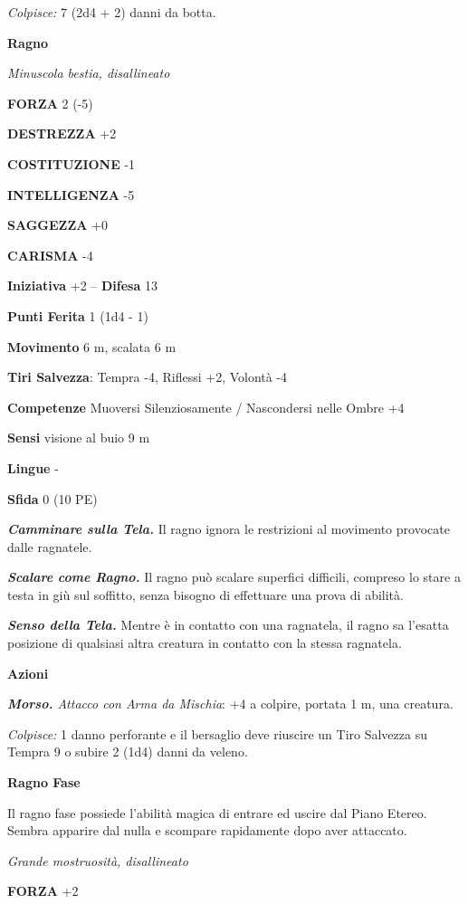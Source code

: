 \begin{multicols}{2}
\emph{Colpisce:} 7 (2d4 + 2) danni da botta.

\medskip\textbf{Ragno}

\emph{Minuscola bestia, disallineato}

\textbf{FORZA} 2 (-5)

\textbf{DESTREZZA} +2

\textbf{COSTITUZIONE} -1

\textbf{INTELLIGENZA} -5

\textbf{SAGGEZZA} +0

\textbf{CARISMA} -4

\textbf{Iniziativa} +2 -- \textbf{Difesa} 13

\textbf{Punti Ferita} 1 (1d4 - 1)

\textbf{Movimento} 6 m, scalata 6 m

\textbf{Tiri Salvezza}: Tempra -4, Riflessi +2, Volontà -4 

\textbf{Competenze} Muoversi Silenziosamente / Nascondersi nelle Ombre +4

\textbf{Sensi} visione al buio 9 m

\textbf{Lingue} -

\textbf{Sfida} 0 (10 PE)

\emph{\textbf{Camminare sulla Tela.}} Il ragno ignora le restrizioni al movimento provocate dalle ragnatele.

\emph{\textbf{Scalare come Ragno.}} Il ragno può scalare superfici difficili, compreso lo stare a testa in giù sul soffitto, senza bisogno  di effettuare una prova di abilità.

\emph{\textbf{Senso della Tela.}} Mentre è in contatto con una ragnatela, il ragno sa l'esatta posizione di qualsiasi altra creatura in contatto con la stessa ragnatela.

\textbf{Azioni}

\emph{\textbf{Morso.} Attacco con Arma da Mischia}: +4 a colpire, portata 1 m, una creatura.

\emph{Colpisce:} 1 danno perforante e il bersaglio deve riuscire un Tiro Salvezza su Tempra 9 o subire 2 (1d4) danni da veleno.

\medskip\textbf{Ragno Fase}

Il ragno fase possiede l'abilità magica di entrare ed uscire dal Piano Etereo. Sembra apparire dal nulla e scompare rapidamente dopo aver attaccato.

\emph{Grande mostruosità, disallineato}

\textbf{FORZA} +2


\end{multicols}
